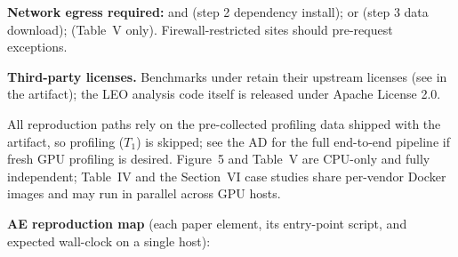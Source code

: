 \documentclass[conference]{IEEEtran}
\begin{document}
\textbf{Network egress required:}  and  (step 2 dependency install);  or  (step 3 data download);  (Table~V only). Firewall-restricted sites should pre-request exceptions.

\textbf{Third-party licenses.} Benchmarks under  retain their upstream licenses (see  in the artifact); the LEO analysis code itself is released under Apache License 2.0.

\artcomp

All reproduction paths rely on the pre-collected profiling data shipped with the artifact, so profiling ($T_1$) is skipped; see the AD for the full end-to-end pipeline if fresh GPU profiling is desired. Figure~5 and Table~V are CPU-only and fully independent; Table~IV and the Section~VI case studies share per-vendor Docker images and may run in parallel across GPU hosts.

\noindent\textbf{AE reproduction map} (each paper element, its entry-point script, and expected wall-clock on a single host):

\begin{center}
\end{center}
\end{document}
